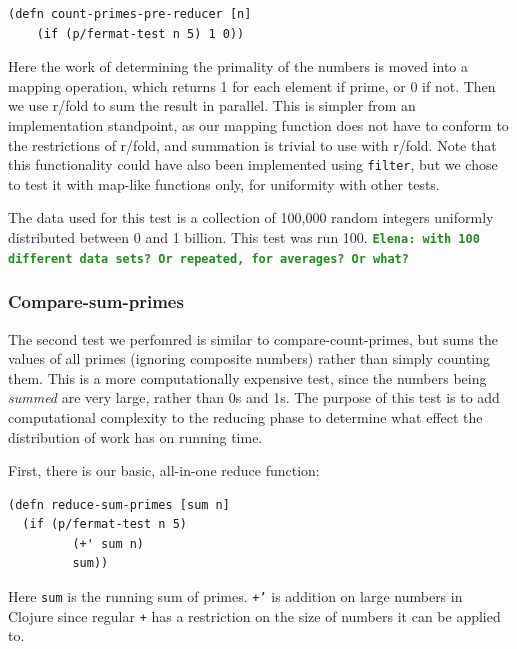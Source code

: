 \documentclass[12pt]{article}
\newcommand{\comment}[1]{{\bf \tt  {#1}}}
\newcommand{\emcomment}[1]{\textcolor{ForestGreen}{\comment{Elena: {#1}}}}
\newcommand{\joecomment}[1]{\textcolor{JoesGold}{\comment{Joe: {#1}}}}
\newcommand{\clocode}[1]{{\texttt {#1}}}
\begin{document}
\begin{verbatim}
(defn count-primes-pre-reducer [n] 
    (if (p/fermat-test n 5) 1 0))
\end{verbatim}

Here the work of determining the primality of the numbers is moved into a mapping operation, which returns 1 for each element if prime, or 0 if not. Then we use r/fold to sum the result in parallel. This is simpler from an implementation standpoint, as our mapping function does not have to conform to the restrictions of r/fold, and summation is trivial to use with r/fold. Note that this functionality could have also been implemented using \clocode{filter}, but we chose to test it with map-like functions only, for uniformity with other tests. 

The data used for this test is a collection of 100,000 random integers uniformly distributed between 0 and 1 billion. This test was run 100. 
\emcomment{with 100 different data sets? Or repeated, for averages? Or what?}

  
\subsubsection{Compare-sum-primes}\label{sec:sum-primes}
The second test we perfomred is similar to compare-count-primes, but sums the values of all primes (ignoring composite numbers) rather than simply counting them. This is a more computationally expensive test, since the numbers being \emph{summed} are very large, rather than 0s and 1s. The purpose of this test is to add computational complexity to the %
reducing phase to determine what effect the distribution of work has on running time.

First, there is our basic, all-in-one reduce function:
\begin{verbatim}
(defn reduce-sum-primes [sum n]
  (if (p/fermat-test n 5)
         (+' sum n)
         sum))
\end{verbatim}
Here \clocode{sum} is the running sum of primes. \clocode{+'} is addition on large numbers in Clojure since regular \clocode{+} has a restriction on the size of numbers it can be applied to. 
\end{document}
